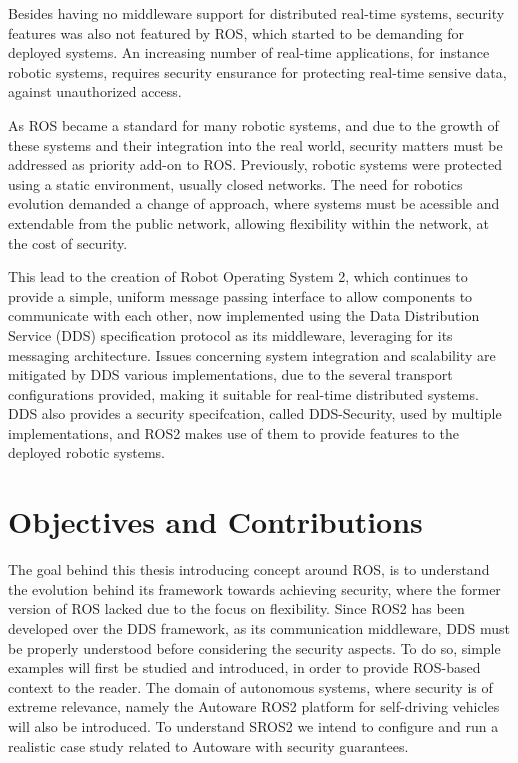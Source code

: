 Besides having no middleware support for distributed real-time systems, security features was also not featured by ROS, which started to be demanding for deployed systems. An increasing number of real-time applications, for instance robotic systems, requires security ensurance for protecting real-time sensive data, against unauthorized access.\cite{lin2009static}    

As ROS became a standard for many robotic systems, and due to the growth of these systems and their integration into the real world, security matters must be addressed as priority add-on to ROS.\cite{diluoffo2018robot, kim2018security} Previously, robotic systems were protected using a static environment, usually closed networks. The need for robotics evolution demanded a change of approach, where systems must be acessible and extendable from the public network, allowing flexibility within the network, at the cost of security.

This lead to the creation of Robot Operating System 2, which continues to provide a simple, uniform message passing interface to allow components to communicate with each other, now implemented using the Data Distribution Service (DDS)\cite{3} specification protocol as its middleware, leveraging for its messaging architecture. Issues concerning system integration and scalability are mitigated by DDS various implementations, due to the several transport configurations provided, making it suitable for real-time distributed systems. DDS also provides a security specifcation, called DDS-Security, used by multiple implementations, and ROS2 makes use of them to provide features to the deployed robotic systems.\cite{8442103}


\section{Objectives and Contributions}

The goal behind this thesis introducing concept around ROS, is to understand the evolution behind its framework towards achieving security, where the former version of ROS lacked due to the focus on flexibility. Since ROS2 has been developed over the DDS framework, as its communication middleware, DDS must be properly understood before considering the security aspects. To do so, simple examples will first be studied and introduced, in order to provide ROS-based context to the reader. The domain of autonomous systems, where security is of extreme relevance, namely the Autoware\cite{8443742} ROS2 platform for self-driving vehicles will also be introduced. To understand SROS2 we intend to configure and run a realistic case study related to Autoware with security guarantees. 

